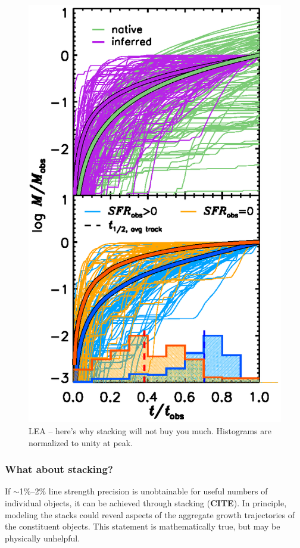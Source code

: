 \documentclass[a4paper,fleqn,usenatbib]{mnras}
\newcommand{\bfr}{\bf\color{red}}
\newcommand{\bfb}{\color{myblue}}
\newcommand{\CITE}{{\bfr CITE}}
\begin{document}
\begin{figure}
\includegraphics[trim = 0cm 1cm 0cm 0cm]{noStackShowV}
\caption{\bfb LEA -- here's why stacking will not buy you much. Histograms are normalized 
		to unity at peak.}
\label{fig:noStack}
\end{figure}

\subsubsection{What about stacking?}
\label{sec:stacking}

If $\sim$1\%--2\% line strength precision is unobtainable for useful numbers of individual objects, 
it can be achieved through stacking (\CITE). In principle, modeling the stacks could reveal aspects 
of the aggregate growth trajectories of the constituent objects. This statement is mathematically true, 
but may be physically unhelpful.
\end{document}
